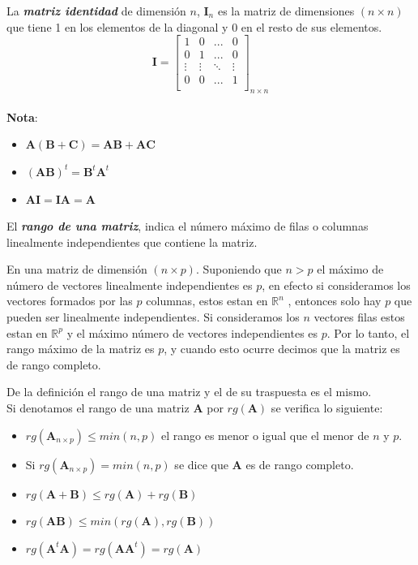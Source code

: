 \documentclass[12pt,letterpaper]{report} %
\begin{document}
La \textit{\textbf{matriz identidad}} de dimensión $n$, $\mathbf{I}_n$ es la matriz de dimensiones  $(n \times n)$ que tiene 1 en los elementos de la diagonal y 0 en el resto de sus elementos.  
$$
\mathbf{I}=
\begin{bmatrix}
1 & 0 & ... & 0 \\
0 & 1 & ... & 0 \\
\vdots   & \vdots &  \ddots & \vdots \\
0 & 0 & ... & 1 \\
\end{bmatrix}_{n\times n}
$$
\\
\textbf{Nota}:
\begin{itemize}
\item $\mathbf{A}(\mathbf{B}+\mathbf{C})=\mathbf{A}\mathbf{B}+\mathbf{A}\mathbf{C}$
\item $(\mathbf{A}\mathbf{B})^t=\mathbf{B}^t\mathbf{A}^t$ 
\item $\mathbf{A}\mathbf{I}=\mathbf{I}\mathbf{A}=\mathbf{A}$
\end{itemize}

El \textit{\textbf{rango de una matriz}}, indica el número máximo de filas o columnas linealmente independientes que contiene la matriz.

En una matriz de dimensión $(n \times p)$. Suponiendo que $n>p$ el máximo de número de vectores linealmente independientes es $p$, en efecto si consideramos los vectores formados por las $p$ columnas, estos estan en $\mathbb{R}^n$ , entonces solo hay $p$ que pueden ser linealmente independientes. Si consideramos los $n$ vectores filas estos estan en $\mathbb{R}^p$ y el máximo número de vectores independientes es $p$. Por lo tanto, el rango máximo de la matriz es $p$, y cuando esto ocurre decimos que la matriz es de rango completo. 

De la definición el rango de una matriz y el de su traspuesta es el mismo.
\\
Si denotamos el rango de una matriz $\mathbf{A}$ por $rg(\mathbf{A})$ se verifica lo siguiente:
\begin{itemize}
\item $rg(\mathbf{A}_{n\times p})\le min(n,p)$ el rango es menor o igual que el menor de $n$ y $p$.
\item Si $rg(\mathbf{A}_{n\times p})=min(n,p)$ se dice que $\mathbf{A}$ es de rango completo. 
\item $rg(\mathbf{A}+\mathbf{B}) \le rg(\mathbf{A}) + rg(\mathbf{B})$
\item $rg(\mathbf{AB}) \le min(rg(\mathbf{A}),rg(\mathbf{B}))$
\item $rg(\mathbf{A}^t\mathbf{A})=rg(\mathbf{A}\mathbf{A}^t)=rg(\mathbf{A})$
\end{itemize}
\end{document}
